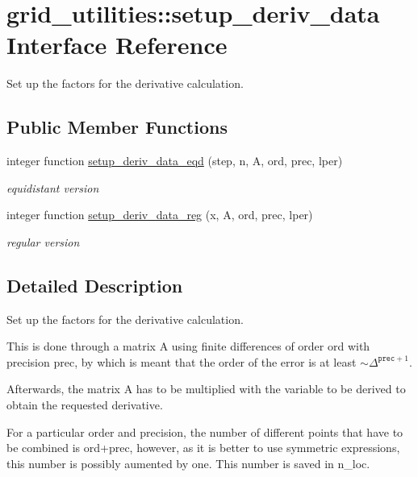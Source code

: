 \hypertarget{interfacegrid__utilities_1_1setup__deriv__data}{}\section{grid\+\_\+utilities\+:\+:setup\+\_\+deriv\+\_\+data Interface Reference}
\label{interfacegrid__utilities_1_1setup__deriv__data}


Set up the factors for the derivative calculation.  


\subsection*{Public Member Functions}
\begin{DoxyCompactItemize}
\item 
integer function \hyperlink{interfacegrid__utilities_1_1setup__deriv__data_aab03825f796bfe596b2df18bbcab86b8}{setup\+\_\+deriv\+\_\+data\+\_\+eqd} (step, n, A, ord, prec, lper)
\begin{DoxyCompactList}\small\item\em equidistant version \end{DoxyCompactList}\item 
integer function \hyperlink{interfacegrid__utilities_1_1setup__deriv__data_a46a1d933286ef2f6676f685079a7c008}{setup\+\_\+deriv\+\_\+data\+\_\+reg} (x, A, ord, prec, lper)
\begin{DoxyCompactList}\small\item\em regular version \end{DoxyCompactList}\end{DoxyCompactItemize}


\subsection{Detailed Description}
Set up the factors for the derivative calculation. 

This is done through a matrix {\ttfamily A} using finite differences of order {\ttfamily ord} with precision {\ttfamily prec}, by which is meant that the order of the error is at least $\sim \Delta^{\texttt{prec}+1}$.

Afterwards, the matrix {\ttfamily A} has to be multiplied with the variable to be derived to obtain the requested derivative.

For a particular order and precision, the number of different points that have to be combined is {\ttfamily ord+prec}, however, as it is better to use symmetric expressions, this number is possibly aumented by one. This number is saved in {\ttfamily n\+\_\+loc}.

